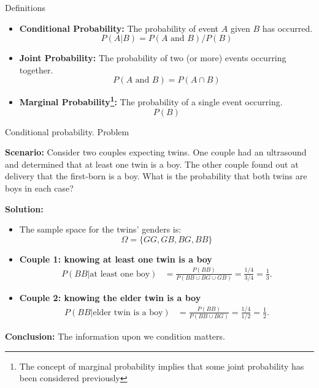 \documentclass[aspectratio=169]{beamer}
\begin{document}
\begin{frame}{Definitions}
    \begin{itemize}
        \item \textbf{Conditional Probability:} The probability of event \(A\) given \(B\) has occurred.
        \[
        P(A | B) = P(A \text{ and } B)/P(B)
        \]
        \item \textbf{Joint Probability:} The probability of two (or more) events occurring together.
        \[
        P(A \text{ and } B) = P(A \cap B)
        \]
        \item \textbf{Marginal Probability\footnote{\scriptsize{The concept of marginal probability implies that some joint probability has been considered previously}}:} The probability of a single event occurring.
        \[
        P(B)
        \]
    \end{itemize}
\end{frame}

\begin{frame}{Conditional probability. Problem}

    \textbf{Scenario:} Consider two couples expecting twins. One couple had an ultrasound and determined that at least one twin is a boy. The other couple found out at delivery that the first-born is a boy. What is the probability that both twins are boys in each case?
    \vspace{0.3cm}
    
    \textbf{Solution:}
    \begin{itemize}
        \item The sample space for the twins' genders is: \[ \Omega = \{ GG, GB, BG, BB \} \]
        \item \textbf{Couple 1: knowing at least one twin is a boy}
        \begin{align*}
            P(BB | \text{at least one boy}) &= \frac{P(BB)}{P(BB \cup BG \cup GB)} 
            = \frac{1/4}{3/4} = \frac{1}{3}.
        \end{align*}
        \item \textbf{Couple 2: knowing the elder twin is a boy}
        \begin{align*}
            P(BB | \text{elder twin is a boy}) &= \frac{P(BB)}{P(BB \cup BG)} 
            = \frac{1/4}{1/2} = \frac{1}{2}.
        \end{align*}
    \end{itemize}
        
    \textbf{Conclusion:} The information upon we condition matters.
\end{frame}
\end{document}

